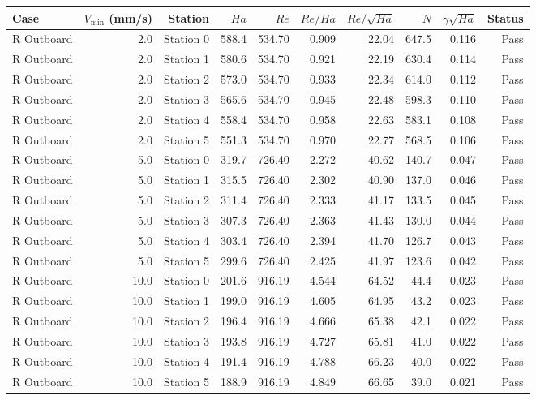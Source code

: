 \begin{tabular}{lrrrrrrrrr}
\toprule
Case & $V_\mathrm{min}$ (mm/s) & Station & $Ha$ & $Re$ & $Re/Ha$ & $Re/\sqrt{Ha}$ & $N$ & $\gamma\sqrt{Ha}$ & Status \\
\midrule
R Outboard & 2.0 & Station 0 & 588.4 & 534.70 & 0.909 & 22.04 & 647.5 & 0.116 & Pass \\
R Outboard & 2.0 & Station 1 & 580.6 & 534.70 & 0.921 & 22.19 & 630.4 & 0.114 & Pass \\
R Outboard & 2.0 & Station 2 & 573.0 & 534.70 & 0.933 & 22.34 & 614.0 & 0.112 & Pass \\
R Outboard & 2.0 & Station 3 & 565.6 & 534.70 & 0.945 & 22.48 & 598.3 & 0.110 & Pass \\
R Outboard & 2.0 & Station 4 & 558.4 & 534.70 & 0.958 & 22.63 & 583.1 & 0.108 & Pass \\
R Outboard & 2.0 & Station 5 & 551.3 & 534.70 & 0.970 & 22.77 & 568.5 & 0.106 & Pass \\
R Outboard & 5.0 & Station 0 & 319.7 & 726.40 & 2.272 & 40.62 & 140.7 & 0.047 & Pass \\
R Outboard & 5.0 & Station 1 & 315.5 & 726.40 & 2.302 & 40.90 & 137.0 & 0.046 & Pass \\
R Outboard & 5.0 & Station 2 & 311.4 & 726.40 & 2.333 & 41.17 & 133.5 & 0.045 & Pass \\
R Outboard & 5.0 & Station 3 & 307.3 & 726.40 & 2.363 & 41.43 & 130.0 & 0.044 & Pass \\
R Outboard & 5.0 & Station 4 & 303.4 & 726.40 & 2.394 & 41.70 & 126.7 & 0.043 & Pass \\
R Outboard & 5.0 & Station 5 & 299.6 & 726.40 & 2.425 & 41.97 & 123.6 & 0.042 & Pass \\
R Outboard & 10.0 & Station 0 & 201.6 & 916.19 & 4.544 & 64.52 & 44.4 & 0.023 & Pass \\
R Outboard & 10.0 & Station 1 & 199.0 & 916.19 & 4.605 & 64.95 & 43.2 & 0.023 & Pass \\
R Outboard & 10.0 & Station 2 & 196.4 & 916.19 & 4.666 & 65.38 & 42.1 & 0.022 & Pass \\
R Outboard & 10.0 & Station 3 & 193.8 & 916.19 & 4.727 & 65.81 & 41.0 & 0.022 & Pass \\
R Outboard & 10.0 & Station 4 & 191.4 & 916.19 & 4.788 & 66.23 & 40.0 & 0.022 & Pass \\
R Outboard & 10.0 & Station 5 & 188.9 & 916.19 & 4.849 & 66.65 & 39.0 & 0.021 & Pass \\

\end{tabular}
